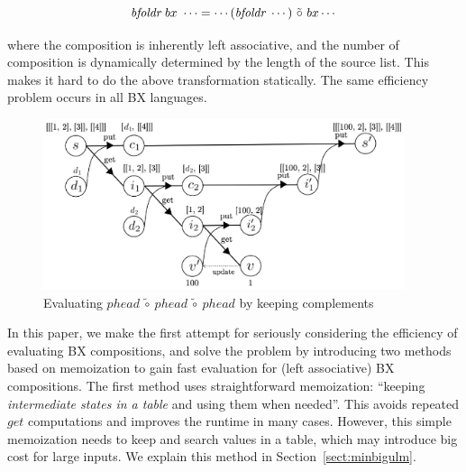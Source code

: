\vspace{1mm}
\minusvspacetwo
 \[
 \mbox{\it bfoldr}~bx~\cdots = \cdots  (\mbox{\it bfoldr}~\cdots)~\tilde{\circ}~bx \cdots
 \]
 \minusvspacetwo

\noindent where the composition is inherently left associative, and the number of composition is dynamically determined by the length of the source list. This makes it hard to do the above transformation statically. The same efficiency problem occurs in all BX languages.



\begin{figure}[!t]
  \centering
  \includegraphics[height=5cm]{./fig/fig3.eps}
  \vspace{-0.25cm}
  \caption{Evaluating $phead \ \tilde{\circ} \ phead \ \tilde{\circ} \ phead$ by keeping complements}
  \vspace{-0.5cm}
  \label{fig:eval-comp-phead-2}
\end{figure}


In this paper, we make the first attempt for seriously considering the efficiency of evaluating BX compositions, and
solve the problem by introducing two methods based on memoization to gain fast evaluation for (left associative) BX compositions.
The first method uses straightforward memoization: ``keeping \emph{intermediate states in a table} and using them when needed''. This avoids repeated $get$ computations and improves the runtime in many cases. However, this simple memoization needs to keep and search values in a table, which may introduce big cost for large inputs. We explain this method in Section~\ref{sect:minbigulm}.

